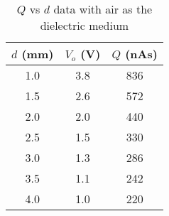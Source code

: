 \begin{table}[H]
    \centering
    \begin{tabular}{|c|c|c|}
    \hline
        $d$ (mm)& $V_o$ (V) & $Q$ (nAs) \\ \hline
        1.0 & 3.8 & 836 \\
        1.5 & 2.6 & 572 \\
        2.0 & 2.0 & 440 \\
        2.5 & 1.5 & 330 \\
        3.0 & 1.3 & 286 \\
        3.5 & 1.1 & 242 \\
        4.0 & 1.0 & 220 \\
    \hline
    \end{tabular}
    \caption{$Q$ vs $d$ data with air as the dielectric medium}
    \label{tab:2}
\end{table}